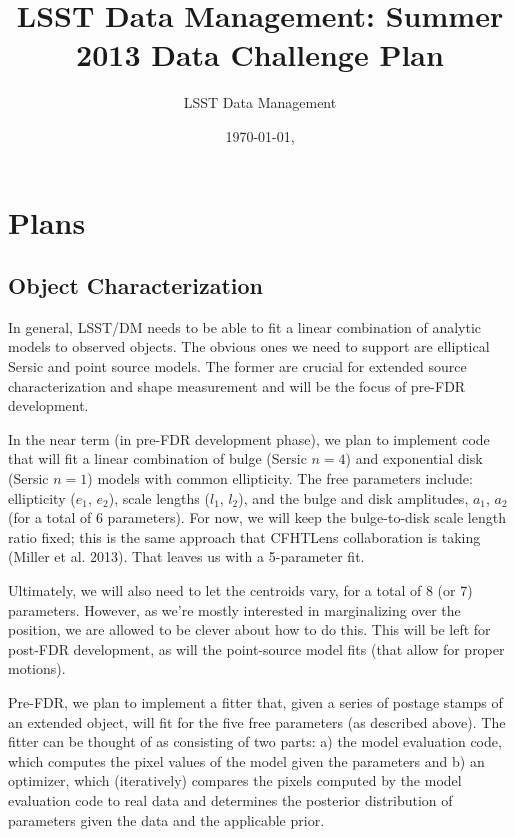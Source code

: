 \documentclass[12pt]{article}
\begin{document}
\title{LSST Data Management: Summer 2013 Data Challenge Plan}
\author{LSST Data Management}
\date{\today{}, \currenttime \\ \vspace{0.5em}  }
\maketitle

\section{Plans}
\subsection{Object Characterization}

In general, LSST/DM needs to be able to fit a linear combination of
analytic models to observed objects. The obvious ones we need to
support are elliptical Sersic and point source models. The former
are crucial for extended source characterization and shape
measurement and will be the focus of pre-FDR development.

In the near term (in pre-FDR development phase), we plan to implement
code that will fit a linear combination of bulge (Sersic $n=4$) and
exponential disk (Sersic $n=1$) models with common ellipticity. The
free parameters include: ellipticity ($e_1$, $e_2$), scale lengths
($l_1$, $l_2$), and the bulge and disk amplitudes, $a_1$, $a_2$ (for a total
of 6 parameters). For now, we will keep the bulge-to-disk scale
length ratio fixed; this is the same approach that CFHTLens
collaboration is taking (Miller et al. 2013). That leaves us with
a 5-parameter fit.

Ultimately, we will also need to let the centroids vary, for a total
of 8 (or 7) parameters. However, as we're mostly interested in
marginalizing over the position, we are allowed to be clever about
how to do this. This will be left for post-FDR development, as will
the point-source model fits (that allow for proper motions).

Pre-FDR, we plan to implement a fitter that, given a series of
postage stamps of an extended object, will fit for the five free
parameters (as described above). The fitter can be thought of as
consisting of two parts: a) the model evaluation code, which computes
the pixel values of the model given the parameters and b) an
optimizer, which (iteratively) compares the pixels computed by the
model evaluation code to real data and determines the posterior
distribution of parameters given the data and the applicable prior.
\end{document}

